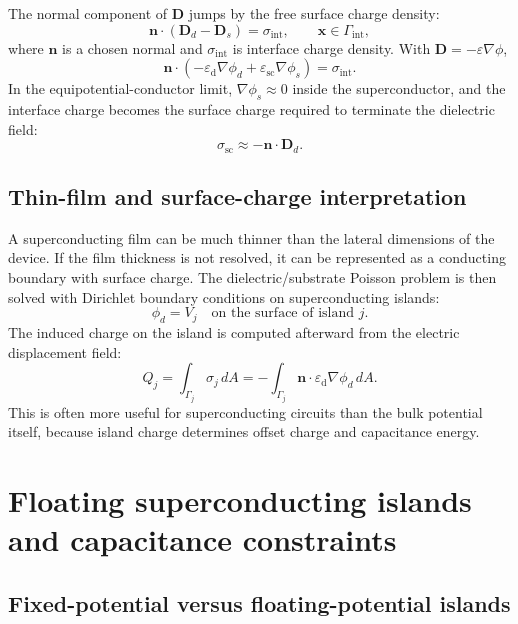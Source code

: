 \documentclass[11pt]{article}
\newcommand{\Dvec}{\mathbf{D}}
\newcommand{\nvecb}{\mathbf{n}}
\newcommand{\Gint}{\Gamma_{\mathrm{int}}}
\newcommand{\epsd}{\varepsilon_{\mathrm{d}}}
\newcommand{\epssc}{\varepsilon_{\mathrm{sc}}}
\begin{document}
The normal component of $\Dvec$ jumps by the free surface charge density:
\begin{equation}
\boxed{\nvecb\cdot(\Dvec_d-\Dvec_s)=\sigma_{\mathrm{int}},\qquad \mathbf{x}\in\Gint,}
\label{eq:interface_D_jump}
\end{equation}
where $\nvecb$ is a chosen normal and $\sigma_{\mathrm{int}}$ is interface charge density. With $\Dvec=-\varepsilon\nabla\phi$,
\begin{equation}
\nvecb\cdot\left(-\epsd\nabla\phi_d+\epssc\nabla\phi_s\right)=\sigma_{\mathrm{int}}.
\end{equation}
In the equipotential-conductor limit, $\nabla\phi_s\approx 0$ inside the superconductor, and the interface charge becomes the surface charge required to terminate the dielectric field:
\begin{equation}
\sigma_{\mathrm{sc}} \approx -\nvecb\cdot\Dvec_d.
\end{equation}

\subsection{Thin-film and surface-charge interpretation}

A superconducting film can be much thinner than the lateral dimensions of the device. If the film thickness is not resolved, it can be represented as a conducting boundary with surface charge. The dielectric/substrate Poisson problem is then solved with Dirichlet boundary conditions on superconducting islands:
\begin{equation}
\phi_d=V_j \quad \text{on the surface of island }j.
\end{equation}
The induced charge on the island is computed afterward from the electric displacement field:
\begin{equation}
Q_j = \int_{\Gamma_j} \sigma_j\,dA
= -\int_{\Gamma_j} \nvecb\cdot\epsd\nabla\phi_d\,dA.
\label{eq:island_charge_surface_integral}
\end{equation}
This is often more useful for superconducting circuits than the bulk potential itself, because island charge determines offset charge and capacitance energy.

\section{Floating superconducting islands and capacitance constraints}

\subsection{Fixed-potential versus floating-potential islands}
\end{document}
